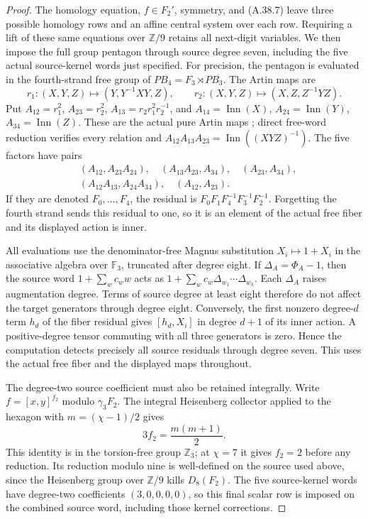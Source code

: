 \begin{proof}
The homology equation, $f\in F_2'$, symmetry, and (A.38.7)
leave three possible homology rows and an affine central
system over each row. Requiring a lift of these same equations
over $\mathbb Z/9$ retains all next-digit variables. We then
impose the full group pentagon through source degree seven,
including the five actual source-kernel words just specified.
For precision, the pentagon is evaluated in the fourth-strand
free group of $P B_4=F_3\rtimes P B_3$. The Artin maps are
\[
 r_1:(X,Y,Z)\mapsto(Y,Y^{-1}XY,Z),\qquad
 r_2:(X,Y,Z)\mapsto(X,Z,Z^{-1}YZ).
 \tag{A.38.8}
\]
Put $A_{12}=r_1^2$, $A_{23}=r_2^2$,
$A_{13}=r_2r_1^2r_2^{-1}$, and
$A_{14}=\operatorname{Inn}(X)$,
$A_{24}=\operatorname{Inn}(Y)$,
$A_{34}=\operatorname{Inn}(Z)$.
These are the actual pure Artin maps
\cite[(2.1)--(2.3)]{DE_CohenFalkRandell2012}; direct free-word
reduction verifies every relation and
$A_{12}A_{13}A_{23}=\operatorname{Inn}((XYZ)^{-1})$.
The five factors have pairs
\[
\begin{split}
 &(A_{12},A_{23}A_{24}),\quad (A_{13}A_{23},A_{34}),\quad
 (A_{23},A_{34}),\\
 &(A_{12}A_{13},A_{24}A_{34}),\quad (A_{12},A_{23}).
\end{split}
 \tag{A.38.9}
\]
If they are denoted $F_0,\ldots,F_4$, the residual is
$F_0F_1F_4^{-1}F_3^{-1}F_2^{-1}$. Forgetting the fourth
strand sends this residual to one, so it is an element of the
actual free fiber and its displayed action is inner.

All evaluations use the denominator-free Magnus substitution
$X_i\mapsto1+X_i$ in the associative algebra over $\mathbb F_3$,
truncated after degree eight. If $\Delta_A=\Phi_A-1$, then
the source word $1+\sum_wc_ww$ acts as
$1+\sum_wc_w\Delta_{w_1}\cdots\Delta_{w_k}$.
Each $\Delta_A$ raises augmentation degree. Terms of source
degree at least eight therefore do not affect the target
generators through degree eight. Conversely, the first
nonzero degree-$d$ term $h_d$ of the fiber residual gives
$[h_d,X_i]$ in degree $d+1$ of its inner action. A positive-degree
tensor commuting with all three generators is zero. Hence
the computation detects precisely all source residuals through
degree seven. This uses the actual free fiber and the displayed
maps throughout.

The degree-two source coefficient must also be retained
integrally. Write $f=[x,y]^{f_2}$ modulo $\gamma_3F_2$.
The integral Heisenberg collector applied to the hexagon with
$m=(\chi-1)/2$ gives
\[
 3f_2=\frac{m(m+1)}2.
 \tag{A.38.10}
\]
This identity is in the torsion-free group $\mathbb Z_3$;
at $\chi=7$ it gives $f_2=2$ before any reduction. Its reduction
modulo nine is well-defined on the source used above, since
the Heisenberg group over $\mathbb Z/9$ kills $D_8(F_2)$.
The five source-kernel words have degree-two coefficients
$(3,0,0,0,0)$, so this final scalar row is imposed on the
combined source word, including those kernel corrections.


\end{proof}
